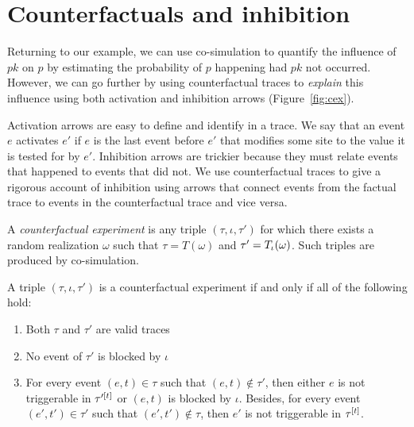 
\section{Counterfactuals and inhibition}\label{sec:inhibition}

Returning to our example, we can use co-simulation to quantify the
influence of $pk$ on $p$ by estimating the probability of $p$
happening had $pk$ not occurred. However, we can go further by using
counterfactual traces to \textit{explain} this influence using both
activation and inhibition arrows (Figure~\ref{fig:cex}).

Activation arrows are easy to define and identify in a trace. We say
that an event $e$ activates $e'$ if $e$ is the last event before $e'$
that modifies some site to the value it is tested for by
$e'$. Inhibition arrows are trickier because they must relate events
that happened to events that did not. We use counterfactual traces to
give a rigorous account of inhibition using arrows that connect events
from the factual trace to events in the counterfactual trace and vice
versa.

A \textit{counterfactual experiment} is any triple
$(\tau, \iota, \tau')$ for which there exists a random realization
$\omega$ such that $\tau = T(\omega)$ and $\tau' =
\ATRAJ{}(\omega)$. Such triples are produced by co-simulation.

\begin{proposition}%
  \label{prop:valid-cex}
  A triple $(\tau, \iota, \tau')$ is a counterfactual experiment if
  and only if all of the following hold:
  \begin{enumerate}[leftmargin=1.3cm, label=\textbf{VC\arabic*.}]
  \item \label{valid-cex:valid-traces} Both $\tau$ and $\tau'$ are
    valid traces
  \item \label{valid-cex:no-blocking} No event of $\tau'$ is blocked
    by $\iota$
  \item \label{valid-cex:co-occur} For every event $(e, t) \in \tau$
    such that $(e, t) \notin \tau'$, then either $e$ is not
    triggerable in $\TSTATE{t}{\tau'}$ or $(e, t)$ is blocked by
    $\iota$.  Besides, for every event $(e', t') \in \tau'$ such that
    $(e', t') \notin \tau$, then $e'$ is not triggerable in
    $\TSTATE{t}{\tau}$.
  \end{enumerate}
\end{proposition}


